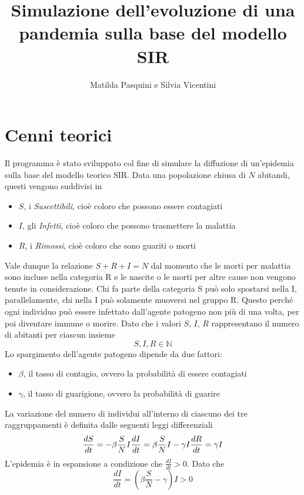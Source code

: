 \documentclass[11pt, a4paper]{article} %
\title{Simulazione dell'evoluzione di una pandemia sulla base del modello SIR}
\author{Matilda Pasquini e Silvia Vicentini}
\begin{document}
\maketitle

\section{Cenni teorici}
Il programma \`{e} stato sviluppato col fine di simulare la diffuzione di 
un'epidemia sulla base del modello teorico SIR. Data una popolazione chiusa di 
$N$ abitandi, questi vengono suddivisi in
\begin{itemize}
\item $S$, i \textit{Suscettibili}, cio\`{e} coloro che possono essere contagiati
\item $I$, gli \textit{Infetti}, cio\`{e} coloro che possono trasmettere la malattia
\item $R$, i \textit{Rimossi}, cio\`{e} coloro che sono guariti o morti
\end{itemize}
Vale dunque la relazione $S+R+I=N$ dal momento che le morti per malattia sono 
incluse nella categoria R e le nascite o le morti per altre cause non vengono 
tenute in considerazione. Chi fa parte della categoria S pu\`{o} solo spostarsi 
nella I, parallelamente, chi nella I pu\`{o} solamente muoversi nel gruppo R. 
Questo perch\'e ogni individuo pu\`{o} essere infettato dall'agente patogeno 
non pi\`{u} di una volta, per poi diventare immune o morire. Dato che i valori 
$S$, $I$, $R$ rappresentano il numero di abitanti per ciascun insieme 
\[S, I, R \in \mathbb{N}\]
Lo spargimento dell'agente patogeno dipende da due fattori:
\begin{itemize}
\item \textit{$\beta$}, il tasso di contagio, ovvero la probabilit\`{a} di
essere contagiati
\item \textit{$\gamma$}, il tasso di guarigione, ovvero la probabilit\`{a} di 
guarire
\end{itemize}
La variazione del numero di individui all'interno di ciascuno dei tre 
raggruppamenti \`{e} definita dalle seguenti leggi differenziali
\begin{equation} 
\frac{dS}{dt} = -\beta\frac{S}{N}I  \\
\frac{dI}{dt} = \beta\frac{S}{N}I-\gamma I \\
\frac{dR}{dt} = \gamma I 
\end{equation}
L'epidemia \`{e} in espansione a condizione che $\frac{dI}{dt} > 0$. 
Dato che \[\frac{dI}{dt}=(\beta\frac{S}{N}-\gamma) I>0\] 
\end{document}
